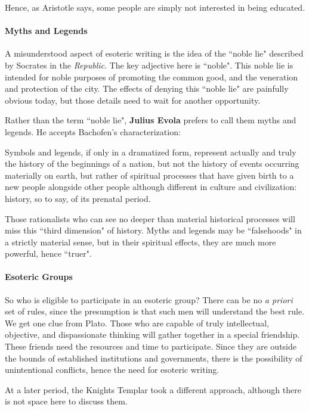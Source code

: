 Hence, as Aristotle says, some people are simply not interested in being educated.

\paragraph{Myths and Legends}
A misunderstood aspect of esoteric writing is the idea of the ``noble lie" described by Socrates in the \emph{Republic}. The key adjective here is ``noble". This noble lie is intended for noble purposes of promoting the common good, and the veneration and protection of the city. The effects of denying this ``noble lie" are painfully obvious today, but those details need to wait for another opportunity.

Rather than the term ``noble lie", \textbf{Julius Evola} prefers to call them myths and legends. He accepts Bachofen's characterization:

\begin{quotex}
Symbols and legends, if only in a dramatized form, represent actually and truly the history of the beginnings of a nation, but not the history of events occurring materially on earth, but rather of spiritual processes that have given birth to a new people alongside other people although different in culture and civilization: history, so to say, of its prenatal period. 

\end{quotex}
Those rationalists who can see no deeper than material historical processes will miss this ``third dimension" of history. Myths and legends may be ``falsehoods" in a strictly material sense, but in their spiritual effects, they are much more powerful, hence ``truer".

\paragraph{Esoteric Groups}
So who is eligible to participate in an esoteric group? There can be no \emph{a priori} set of rules, since the presumption is that such men will understand the best rule. We get one clue from Plato. Those who are capable of truly intellectual, objective, and dispassionate thinking will gather together in a special friendship. These friends need the resources and time to participate. Since they are outside the bounds of established institutions and governments, there is the possibility of unintentional conflicts, hence the need for esoteric writing.

At a later period, the Knights Templar took a different approach, although there is not space here to discuss them.

